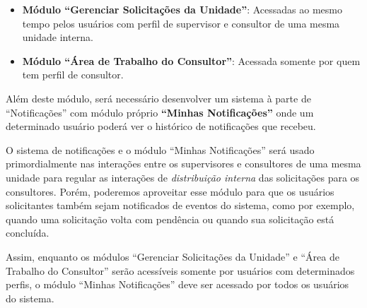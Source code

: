 \begin{itemize}
	\item \textbf{Módulo ``Gerenciar Solicitações da Unidade''}: Acessadas ao mesmo tempo pelos usuários com perfil de supervisor e consultor de uma mesma unidade interna.
	\item \textbf{Módulo ``Área de Trabalho do Consultor''}: Acessada somente por quem tem perfil de consultor.
\end{itemize}


Além deste módulo, será necessário desenvolver um sistema à parte de ``Notificações'' com módulo próprio \textbf{``Minhas Notificações''} onde um determinado usuário poderá ver o histórico de notificações que recebeu.

O sistema de notificações e o módulo ``Minhas Notificações'' será usado primordialmente nas interações entre os supervisores e consultores de uma mesma unidade para regular as interações de \emph{distribuição interna} das solicitações para os consultores.  Porém, poderemos aproveitar esse módulo para que os usuários solicitantes também sejam notificados de eventos do sistema, como por exemplo, quando uma solicitação volta com pendência ou quando sua solicitação está concluída.

Assim, enquanto os módulos ``Gerenciar Solicitações da Unidade'' e ``Área de Trabalho do Consultor'' serão acessíveis somente por usuários com determinados perfis, o módulo ``Minhas Notificações'' deve ser acessado por todos os usuários do sistema. 